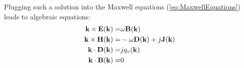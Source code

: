 Plugging such a solution into the Maxwell equations (\ref{eq:MaxwellEquations}) leads to algebraic equations:
\begin{subequations}
	\begin{align}
		{\mathbf k} \times {\mathbf E} ({\mathbf k}) 
		=& 
		\omega {\mathbf B} ({\mathbf k})
		\\
		{\mathbf k} \times {\mathbf H} ({\mathbf k}) 
		=& 
		-\omega {\mathbf D} ({\mathbf k})
		+ 	
		j{\mathbf J} ({\mathbf k}) 
		\\
		{\mathbf k}  \cdot {\mathbf D} ({\mathbf k}) 
		=& j q_v({\mathbf k}) 
		\\
		{\mathbf k}  \cdot {\mathbf B} ({\mathbf k}) 
		=& 0
	\end{align}
	\label{eq:k-omegaMaxwellEquations}
\end{subequations}

